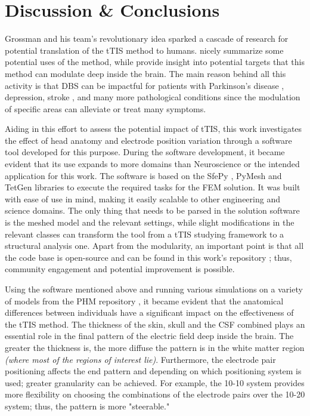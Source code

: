 \pagebreak
\chapter{Discussion \& Conclusions}
\label{sec:discussion}

Grossman and his team's revolutionary idea sparked a cascade of research for potential translation of the \gls{tTIS} method to humans.  nicely summarize some potential uses of the method, while  provide insight into potential targets that this method can modulate deep inside the brain. The main reason behind all this activity is that \gls{DBS} can be impactful for patients with Parkinson's disease \cite{Cagnan2019}, depression, stroke \cite{Bao2020}, and many more \cite{Cagnan2019,Polania2018} pathological conditions since the modulation of specific areas can alleviate or treat many symptoms.

Aiding in this effort to assess the potential impact of \gls{tTIS}, this work investigates the effect of head anatomy and electrode position variation through a software tool developed for this purpose. During the software development, it became evident that its use expands to more domains than Neuroscience or the intended application for this work. The software is based on the SfePy \cite{Cimrman2019}, PyMesh \cite{pymesh} and TetGen \cite{tetgen} libraries to execute the required tasks for the \gls{FEM} solution. It was built with ease of use in mind, making it easily scalable to other engineering and science domains. The only thing that needs to be parsed in the solution software is the meshed model and the relevant settings, while slight modifications in the relevant classes can transform the tool from a \gls{tTIS} studying framework to a structural analysis one. Apart from the modularity, an important point is that all the code base is open-source and can be found in this work's repository \cite{thesis_repo}; thus, community engagement and potential improvement is possible.

Using the software mentioned above and running various simulations on a variety of models from the \gls{PHM} repository \cite{Lee2016,Lee2018,ErikG.Lee2016}, it became evident that the anatomical differences between individuals have a significant impact on the effectiveness of the \gls{tTIS} method. The thickness of the skin, skull and the \gls{CSF} combined plays an essential role in the final pattern of the electric field deep inside the brain. The greater the thickness is, the more diffuse the pattern is in the white matter region \textit{(where most of the regions of interest lie)}. Furthermore, the electrode pair positioning affects the end pattern and depending on which positioning system is used; greater granularity can be achieved. For example, the 10-10 system provides more flexibility on choosing the combinations of the electrode pairs over the 10-20 system; thus, the pattern is more "steerable."


